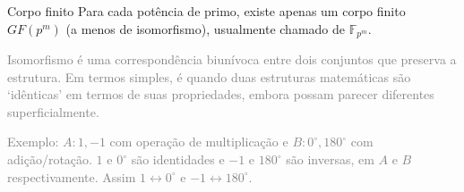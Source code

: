 \begin{frame}[allowframebreaks]
\begin{block}{Corpo finito}
  \vspace{3ex}
  Para cada potência de primo, existe apenas um corpo finito $GF(p^m)$ (a menos de isomorfismo), usualmente chamado de $\mathbb{F}_{p^m}$.
\end{block}

\vspace{2ex}
\textcolor{gray}{\small Isomorfismo é uma correspondência biunívoca entre dois conjuntos que preserva a estrutura. Em termos simples, é quando duas estruturas matemáticas são `idênticas' em termos de suas propriedades, embora possam parecer diferentes superficialmente.}

\vspace{1ex}
\textcolor{gray}{\small Exemplo: $A:{1,-1}$ com operação de multiplicação e $B:{0^{\circ}, 180^{\circ}}$ com adição/rotação. $1$ e $0^{\circ}$ são identidades e $-1$ e $180^{\circ}$ são inversas, em $A$ e $B$ respectivamente. Assim $1 \leftrightarrow 0^{\circ}$ e $-1 \leftrightarrow 180^{\circ}$.}

\end{frame}



